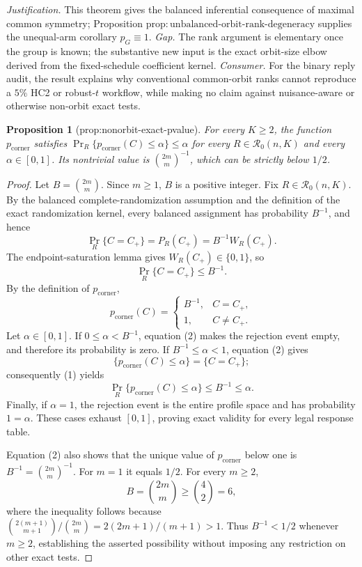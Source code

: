 \documentclass{article}
\newtheorem{proposition}{Proposition}
\begin{document}
\par\smallskip\noindent \textit{Justification.} This theorem gives the balanced inferential consequence of maximal common symmetry; Proposition \(\mathrm{prop{:}unbalanced\text{-}orbit\text{-}rank\text{-}degeneracy}\) supplies the unequal-arm corollary \(p_G\equiv1\). \textit{Gap.} The rank argument is elementary once the group is known; the substantive new input is the exact orbit-size elbow derived from the fixed-schedule coefficient kernel. \textit{Consumer.} For the binary reply audit, the result explains why conventional common-orbit ranks cannot reproduce a \(5\%\) HC2 or robust-\(t\) workflow, while making no claim against nuisance-aware or otherwise non-orbit exact tests.

\begin{proposition}[prop:nonorbit-exact-pvalue]\label{prop:nonorbit-exact-pvalue}
For every \(K\geq2\), the function \(p_{\mathrm{corner}}\) satisfies \(\Pr_R\{p_{\mathrm{corner}}(C)\leq\alpha\}\leq\alpha\) for every \(R\in\mathcal R_0(n,K)\) and every \(\alpha\in[0,1]\). Its nontrivial value is \(\binom{2m}{m}^{-1}\), which can be strictly below \(1/2\).
\end{proposition}
\begin{proof}
Let \(B=\binom{2m}{m}\).  Since \(m\geq 1\), \(B\) is a positive integer.  Fix \(R\in\mathcal R_0(n,K)\).  By the balanced complete-randomization assumption and the definition of the exact randomization kernel, every balanced assignment has probability \(B^{-1}\), and hence
\[
 \Pr_R\{C=C_+\}=P_R(C_+)=B^{-1}W_R(C_+).
\]
The endpoint-saturation lemma gives \(W_R(C_+)\in\{0,1\}\), so
\[
 \Pr_R\{C=C_+\}\leq B^{-1}. \tag{1}
\]
By the definition of \(p_{\mathrm{corner}}\),
\[
 p_{\mathrm{corner}}(C)=
 \begin{cases}
 B^{-1},&C=C_+,\\
 1,&C\neq C_+.
 \end{cases} \tag{2}
\]
Let \(\alpha\in[0,1]\).  If \(0\leq\alpha<B^{-1}\), equation (2) makes the rejection event empty, and therefore its probability is zero.  If \(B^{-1}\leq\alpha<1\), equation (2) gives
\[
 \{p_{\mathrm{corner}}(C)\leq\alpha\}=\{C=C_+\};
\]
consequently (1) yields
\[
 \Pr_R\{p_{\mathrm{corner}}(C)\leq\alpha\}
 \leq B^{-1}\leq\alpha.
\]
Finally, if \(\alpha=1\), the rejection event is the entire profile space and has probability \(1=\alpha\).  These cases exhaust \([0,1]\), proving exact validity for every legal response table.

Equation (2) also shows that the unique value of \(p_{\mathrm{corner}}\) below one is \(B^{-1}=\binom{2m}{m}^{-1}\).  For \(m=1\) it equals \(1/2\).  For every \(m\geq2\),
\[
 B=\binom{2m}{m}\geq\binom{4}{2}=6,
\]
where the inequality follows because \(\binom{2(m+1)}{m+1}/\binom{2m}{m}=2(2m+1)/(m+1)>1\).  Thus \(B^{-1}<1/2\) whenever \(m\geq2\), establishing the asserted possibility without imposing any restriction on other exact tests.
\end{proof}
\end{document}
